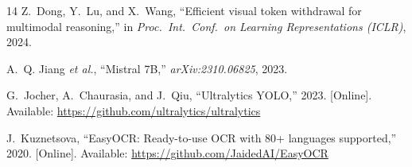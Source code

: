 \documentclass[10pt,twocolumn]{article}
\begin{document}
\begin{thebibliography}{14}
Z.~Dong, Y.~Lu, and X.~Wang,
``Efficient visual token withdrawal for multimodal reasoning,''
in \textit{Proc.\ Int.\ Conf.\ on Learning Representations (ICLR)}, 2024.

A.~Q. Jiang \textit{et al.},
``Mistral 7B,''
\textit{arXiv:2310.06825}, 2023.

G.~Jocher, A.~Chaurasia, and J.~Qiu,
``Ultralytics YOLO,'' 2023.
[Online]. Available: \url{https://github.com/ultralytics/ultralytics}

J.~Kuznetsova,
``EasyOCR: Ready-to-use OCR with 80+ languages supported,'' 2020.
[Online]. Available: \url{https://github.com/JaidedAI/EasyOCR}

\end{thebibliography}
\end{document}
